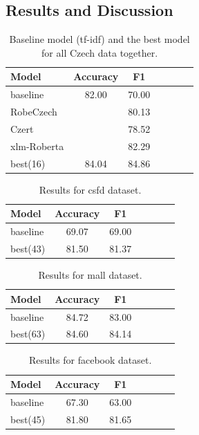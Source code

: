 
\subsection{Results and Discussion}

\begin{table}[!h]
\centering
  \begin{tabular}{|l||c|c|c||c|c|c|}
  \hline
    Model & Accuracy & F1 \\ \hline \hline
    baseline & 82.00 & 70.00  \\ \hline
    RobeCzech &  & 80.13 \\ \hline
    Czert & & 78.52 \\ \hline
    xlm-Roberta && 82.29 \\ \hline
    best(16) & 84.04 & 84.86 \\ \hline
  \end{tabular}
  \caption{ Baseline model (tf-idf) and the best model for all Czech data together.} %
  \label{tab:res_czech}
\end{table}

\begin{table}[!h]
\centering
  \begin{tabular}{|l||c|c|c||c|c|c|}
  \hline
    Model & Accuracy & F1 \\ \hline \hline
    baseline & 69.07 & 69.00 \\ \hline
    best(43) & 81.50 & 81.37 \\ \hline
  \end{tabular}
  \caption{ Results for csfd dataset.} %
  \label{tab:res_csfd}
\end{table}
\begin{table}[!h]
\centering
  \begin{tabular}{|l||c|c|c||c|c|c|}
  \hline
    Model & Accuracy & F1 \\ \hline \hline
    baseline & 84.72& 83.00 \\ \hline
    best(63) & 84.60 & 84.14 \\ \hline
  \end{tabular}
  \caption{Results for mall dataset.} %
  \label{tab:res_mall}
\end{table}
\begin{table}[!h]
\centering
  \begin{tabular}{|l||c|c|c||c|c|c|}
  \hline
    Model & Accuracy & F1 \\ \hline \hline
    baseline & 67.30 & 63.00 \\ \hline
    best(45) & 81.80 & 81.65 \\ \hline
  \end{tabular}
  \caption{ Results for facebook dataset.} %
  \label{tab:res_facebook}
\end{table}

